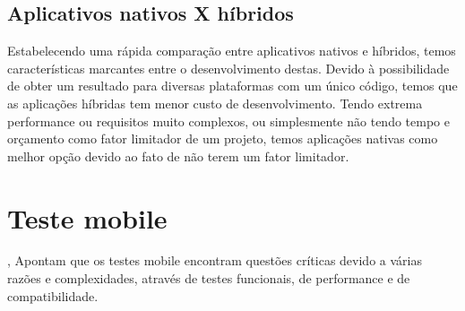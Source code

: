 

\subsection{Aplicativos nativos X híbridos}\label{sub_sec:nativosXhibridos}


Estabelecendo uma rápida comparação entre aplicativos nativos e híbridos, temos  características marcantes entre o desenvolvimento destas. Devido à possibilidade de obter um resultado para diversas plataformas com um único código, temos que as aplicações híbridas tem menor custo de desenvolvimento. Tendo extrema performance ou requisitos muito complexos, ou simplesmente não tendo tempo e orçamento como fator limitador de um projeto, temos aplicações nativas como melhor opção devido ao fato de não terem um fator limitador.


\section{Teste mobile}\label{sec:mobile_testing}


\cite{Prathibhan-2014}, Apontam que os testes mobile encontram questões críticas devido a várias razões e complexidades, através de testes funcionais, de performance e de compatibilidade.


